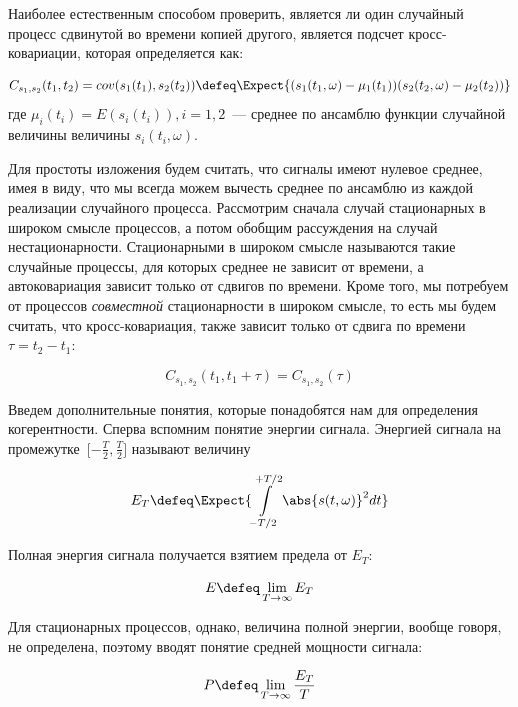 Наиболее естественным способом проверить, является ли один случайный процесс
сдвинутой во времени копией другого, является подсчет кросс-ковариации, которая
определяется как:

\begin{equation}
    C_{s_1, s_2}(t_1,t_2) = cov(s_1(t_1), s_2(t_2)) \defeq
    \Expect{(s_1(t_1,\omega) - \mu_1(t_1))(s_2(t_2,\omega) - \mu_2(t_2))}
    \label{eq:cross_covar_def}
\end{equation}
где $\mu_i(t_i) = E(s_i(t_i)), i=1,2$~--- среднее по ансамблю функции случайной величины величины
$s_i(t_i,\omega)$.

Для простоты изложения будем считать, что сигналы имеют нулевое среднее, имея в
виду, что мы всегда можем вычесть среднее по ансамблю из каждой реализации
случайного процесса.  Рассмотрим сначала случай стационарных в широком смысле
процессов, а потом обобщим рассуждения на случай нестационарности.
Стационарными в широком смысле называются такие случайные процессы, для которых
среднее не зависит от времени, а автоковариация зависит только от сдвигов по
времени.  Кроме того, мы потребуем от процессов \emph{совместной}
стационарности в широком смысле, то есть мы будем считать, что
кросс-ковариация, также зависит только от сдвига по времени $\tau = t_2 - t_1$:

\begin{equation}
    C_{s_1,s_2}(t_1,t_1+\tau) = C_{s_1,s_2}(\tau)
\end{equation}

Введем дополнительные понятия, которые понадобятся нам для определения
когерентности.  Сперва вспомним понятие энергии сигнала.  Энергией сигнала на
промежутке~$\Big[{-\frac{T}{2}},\frac{T}{2}\Big]$ называют величину

\begin{equation}
    E_T \defeq \Expect{\int\limits_{-T/2}^{+T/2} \abs{s(t,\omega)} ^ 2 dt}
\end{equation}

Полная энергия сигнала получается взятием предела от $E_T$:

\begin{equation}
    E \defeq \lim_{T \to \infty} E_T
\end{equation}

Для стационарных процессов, однако, величина полной энергии, вообще говоря, не
определена, поэтому вводят понятие средней мощности сигнала:

\begin{equation}
    P \defeq \lim_{T \to \infty}\frac{E_T}{T}
\end{equation}

